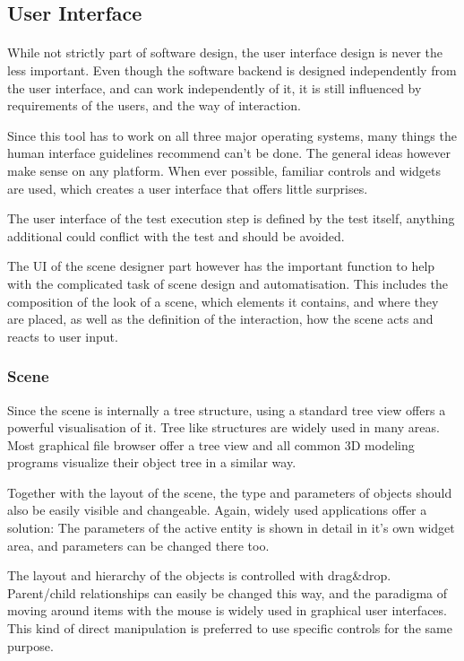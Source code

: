 \subsection{User Interface}
\paragraph{}
While not strictly part of software design, the user interface design is never the less important\cite{hig}.
Even though the software backend is designed independently from the user interface, and can work independently of it, it is still influenced by requirements of the users, and the way of interaction.

Since this tool has to work on all three major operating systems, many things the human interface guidelines recommend can't be done.
The general ideas however make sense on any platform.
When ever possible, familiar controls and widgets are used, which creates a user interface that offers little surprises.

The user interface of the test execution step is defined by the test itself, anything additional could conflict with the test and should be avoided.

The UI of the scene designer part however has the important function to help with the complicated task of scene design and automatisation. This includes the composition of the look of a scene, which elements it contains, and where they are placed, as well as the definition of the interaction, how the scene acts and reacts to user input.

\subsubsection{Scene}
Since the scene is internally a tree structure, using a standard tree view offers a powerful visualisation of it.
Tree like structures are widely used in many areas.
Most graphical file browser offer a tree view and all common 3D modeling programs visualize their object tree in a similar way.

Together with the layout of the scene, the type and parameters of objects should also be easily visible and changeable.
Again, widely used applications offer a solution: The parameters of the active entity is shown in detail in it's own widget area, and parameters can be changed there too.

The layout and hierarchy of the objects is controlled with drag\&drop.
Parent/child relationships can easily be changed this way, and the paradigma of moving around items with the mouse is widely used in graphical user interfaces.
This kind of direct manipulation is preferred to use specific controls for the same purpose.

